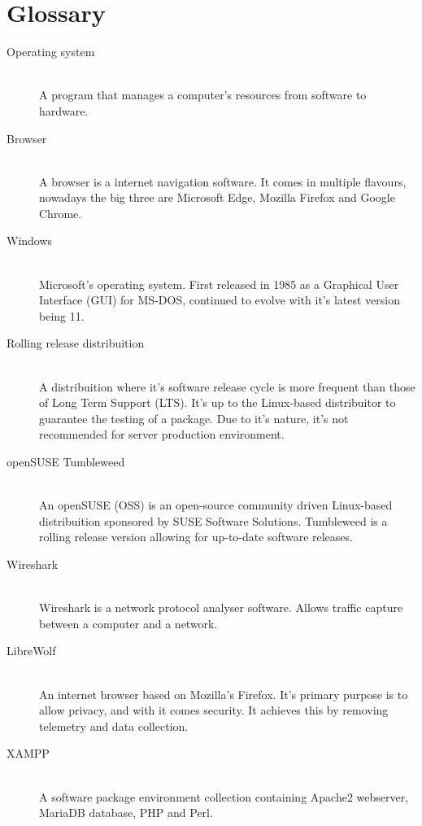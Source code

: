 \documentclass[11pt,a4paper]{report}
\begin{document}
\chapter*{Glossary}

    \begin{description}
        \item[Operating system] \hfill \\
            A program that manages a computer's resources from software to hardware.
        \item[Browser] \hfill \\
            A browser is a internet navigation software. It comes in multiple flavours, nowadays the big three are Microsoft Edge, Mozilla Firefox and Google Chrome.
        \item[Windows] \hfill \\
            Microsoft's operating system. First released in 1985 as a Graphical User Interface (GUI) for MS-DOS, continued to evolve with it's latest version being 11.
        \item[Rolling release distribuition] \hfill \\
            A distribuition where it's software release cycle is more frequent than those of Long Term Support (LTS). It's up to the Linux-based distribuitor to guarantee the testing of a package.
            Due to it's nature, it's not recommended for server production environment.
        \item[openSUSE Tumbleweed] \hfill \\
            An openSUSE (OSS) is an open-source community driven Linux-based distribuition sponsored by SUSE Software Solutions. Tumbleweed is a rolling release version allowing for up-to-date software releases.
        \item[Wireshark] \hfill \\
            Wireshark is a network protocol analyser software. Allows traffic capture between a computer and a network.
        \item[LibreWolf] \hfill \\
            An internet browser based on Mozilla's Firefox. It's primary purpose is to allow privacy, and with it comes security. It achieves this by removing telemetry and data collection.
        \item[XAMPP] \hfill \\
            A software package environment collection containing Apache2 webserver, MariaDB database, PHP and Perl.

\end{description}
\end{document}
